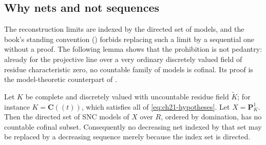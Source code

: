 \subsection{Why nets and not sequences}
\label{sec:ch21-nets}

The reconstruction limits are indexed by the directed set of models,
and the book's standing convention
() forbids replacing such a limit by a
sequential one without a proof.  The following lemma shows that the
prohibition is not pedantry: already for the projective line over a very
ordinary discretely valued field of residue characteristic zero, no
countable family of models is cofinal.  Its proof is the model-theoretic
counterpart of .

\begin{lemma}
\label{lem:ch21-no-cofinal-sequence}
Let $K$ be complete and discretely valued with uncountable residue field
$\widetilde K$; for instance $K=\mathbf C((t))$, which satisfies all of
\eqref{eq:ch21-hypotheses}.  Let $X=\mathbf P^1_K$.  Then the directed set
of SNC models of $X$ over $R$, ordered by domination, has no countable
cofinal subset.  Consequently no decreasing net indexed by that set may be
replaced by a decreasing sequence merely because the index set is directed.
\end{lemma}


